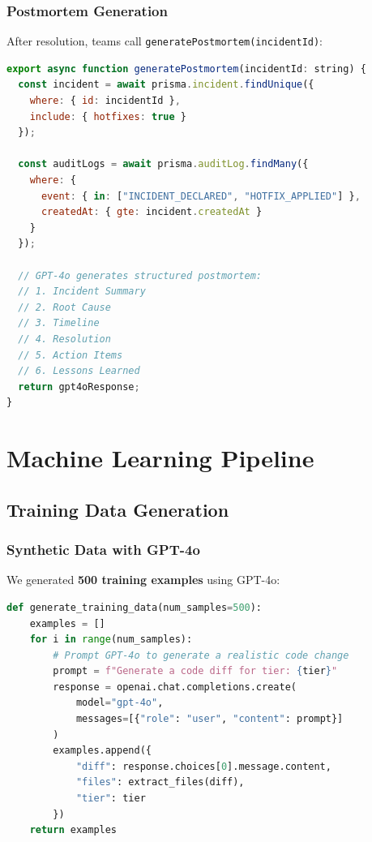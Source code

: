 \documentclass[11pt,a4paper]{article}
\begin{document}
\newpage
\subsubsection{Postmortem Generation}
After resolution, teams call \texttt{generatePostmortem(incidentId)}:

\begin{lstlisting}[language=JavaScript,caption=Postmortem from Audit Trail]
export async function generatePostmortem(incidentId: string) {
  const incident = await prisma.incident.findUnique({
    where: { id: incidentId },
    include: { hotfixes: true }
  });
  
  const auditLogs = await prisma.auditLog.findMany({
    where: {
      event: { in: ["INCIDENT_DECLARED", "HOTFIX_APPLIED"] },
      createdAt: { gte: incident.createdAt }
    }
  });
  
  // GPT-4o generates structured postmortem:
  // 1. Incident Summary
  // 2. Root Cause
  // 3. Timeline
  // 4. Resolution
  // 5. Action Items
  // 6. Lessons Learned
  return gpt4oResponse;
}
\end{lstlisting}

\newpage
\section{Machine Learning Pipeline}

\subsection{Training Data Generation}

\subsubsection{Synthetic Data with GPT-4o}
We generated \textbf{500 training examples} using GPT-4o:

\begin{lstlisting}[language=Python,caption=Data Generation (generate\_data.py)]
def generate_training_data(num_samples=500):
    examples = []
    for i in range(num_samples):
        # Prompt GPT-4o to generate a realistic code change
        prompt = f"Generate a code diff for tier: {tier}"
        response = openai.chat.completions.create(
            model="gpt-4o",
            messages=[{"role": "user", "content": prompt}]
        )
        examples.append({
            "diff": response.choices[0].message.content,
            "files": extract_files(diff),
            "tier": tier
        })
    return examples
\end{lstlisting}
\end{document}
